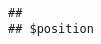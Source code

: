 \documentclass[
]{book}
\begin{document}
\begin{verbatim}
                                                                                                                                                                                                                                                                                                                                                                                                                                                                                                                                                                                                                                                                                                                                                                                                                                                                                                                                                                                                                                                                                                                                                                                                                                                                                                                                                                                                                                                                                                                                                                                                                                                                                                                                                                 
## 
## $position

\end{verbatim}
\end{document}
